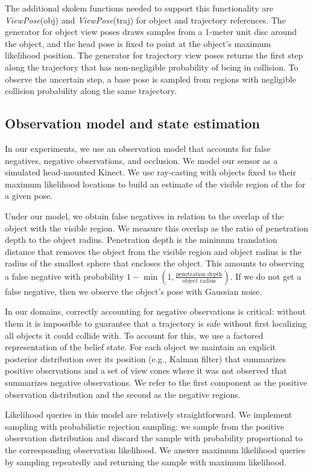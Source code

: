 The additional skolem functions needed to support this functionality
are \emph{ViewPose}(obj) and \emph{ViewPose}(traj) for object and
trajectory references. The generator for object view poses draws
samples from a 1-meter unit disc around the object, and the head pose
is fixed to point at the object's maximum likelihood position. The
generator for trajectory view poses returns the first step along the
trajectory that has non-negligible probability of being in
collision. To observe the uncertain step, a base pose is sampled from
regions with negligible collision probability along the same
trajectory.

\subsection{Observation model and state estimation}
In our experiments, we use an observation model that accounts for
false negatives, negative observations, and occlusion. We model our
sensor as a simulated head-mounted Kinect. We use ray-casting with
objects fixed to their maximum likelihood locations to build an
estimate of the visible region of the \mld{} for a given pose.

Under our model, we obtain false negatives in relation to the overlap
of the object with the visible region. We measure this overlap as the
ratio of penetration depth to the object radius. Penetration depth is
the minimum translation distance that removes the object from the
visible region and object radius is the radius of the smallest sphere
that encloses the object. This amounts to observing a false negative
with probability $1-\min \left( 1, \frac{\text{penetration
    depth}}{\text{object radius}} \right)$. If we do not get a false
negative, then we observe the object's pose with Gaussian noise.

In our domains, correctly accounting for negative observations is
critical: without them it is impossible to guarantee that a trajectory
is safe without first localizing all objects it could collide with. To
account for this, we use a factored representation of the belief
state. For each object we maintain an explicit posterior distribution
over its position (e.g., Kalman filter) that summarizes positive
observations and a set of view cones where it was not observed that
summarizes negative observations. We refer to the first component as
the positive observation distribution and the second as the negative
regions. 

Likelihood queries in this model are relatively straightforward. We
implement sampling with probabilistic rejection sampling: we sample
from the positive observation distribution and discard the sample with
probability proportional to the corresponding observation
likelihood. We answer maximum likelihood queries by sampling
repeatedly and returning the sample with maximum likelihood.

